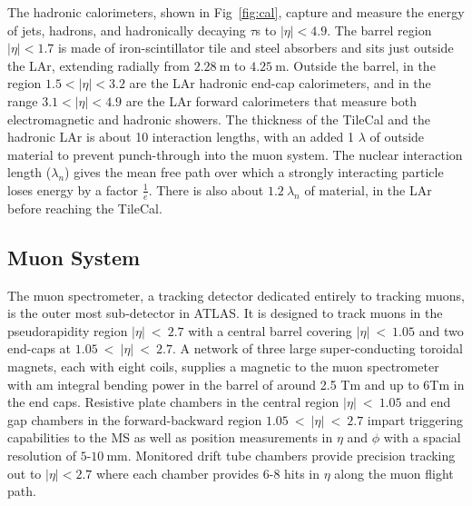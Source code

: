 The hadronic calorimeters, shown in Fig~\ref{fig:cal}, capture and measure the energy of jets, hadrons, and hadronically decaying $\tau$s to $|\eta|<4.9$.  The barrel region $|\eta| < 1.7$ is made of iron-scintillator tile and steel absorbers and sits just outside the LAr, extending radially from $2.28~\mathrm{m}$ to $4.25~\mathrm{m}$.  Outside the barrel, in the region $1.5<|\eta|<3.2$ are the LAr hadronic end-cap calorimeters, and in the range $3.1<|\eta|<4.9$ are the LAr forward calorimeters that measure both electromagnetic and hadronic showers.  The thickness of the TileCal and the hadronic LAr is about 10 interaction lengths, with an added 1 $\lambda$ of outside material to prevent punch-through into the muon system.  The nuclear interaction length ($\lambda_n$) gives the mean free path over which a strongly interacting particle loses energy by a factor $\frac{1}{e}$.  There is also about $1.2~\lambda_n$ of material, in the LAr before reaching the TileCal.   
\subsection{Muon System}
The muon spectrometer, a tracking detector dedicated entirely to tracking muons, is the outer most sub-detector in ATLAS.  It is designed to track muons in the pseudorapidity region $|\eta|~<~2.7$ with a central barrel covering $|\eta|~<~1.05$ and two end-caps at $1.05~<~|\eta|~<~2.7$.  A network of three large super-conducting toroidal magnets, each with eight coils, supplies a magnetic to the muon spectrometer with am integral bending power in the barrel of around 2.5 Tm and up to 6Tm in the end caps.  Resistive plate chambers in the central region $|\eta|~<~1.05$ and end gap chambers in the forward-backward region $1.05~<~|\eta|~<~2.7$ impart triggering capabilities to the MS as well as position measurements in $\eta$ and $\phi$ with a spacial resolution of $5$-$10~\mathrm{mm}$. Monitored drift tube chambers provide precision tracking out to $|\eta| < 2.7$ where each chamber provides $6$-$8$ hits in $\eta$ along the muon flight path.  %

